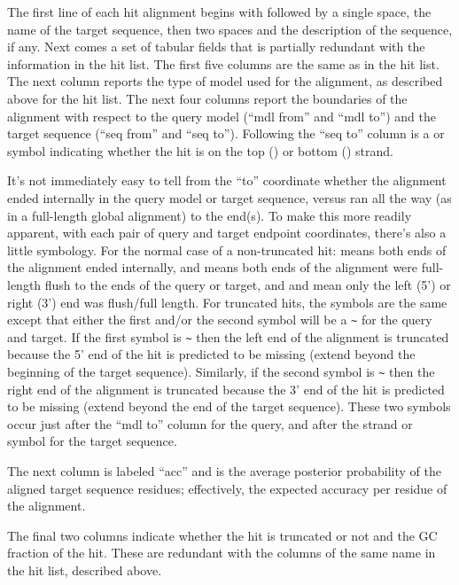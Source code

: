The first line of each hit alignment begins with \otext{>>} followed
by a single space, the name of the target sequence, then two spaces
and the description of the sequence, if any. Next comes a set of
tabular fields that is partially redundant with the information in the
hit list. The first five columns are the same as in the hit list. The
next column reports the type of model used for the alignment, as
described above for the hit list. The next four columns report the
boundaries of the alignment with respect to the query model (``mdl
from'' and ``mdl to'') and the target sequence (``seq from'' and ``seq
to''). Following the ``seq to'' column is a \otext{+} or \otext{-}
symbol indicating whether the hit is on the top (\otext{+}) or bottom
(\otext{-}) strand.

It's not immediately easy to tell from the ``to'' coordinate whether
the alignment ended internally in the query model or target sequence,
versus ran all the way (as in a full-length global alignment) to the
end(s). To make this more readily apparent, with each pair of query
and target endpoint coordinates, there's also a little symbology. For
the normal case of a non-truncated hit:  means both ends of
the alignment ended internally, and \otext{[]} means both ends of the
alignment were full-length flush to the ends of the query or target,
and \otext{[.}  and \otext{.]} mean only the left (5') or right (3') end
was flush/full length. For truncated hits, the symbols are the same
except that either the first and/or the second symbol will be a
\verb+~+ for the query and target. If the first symbol is \verb+~+
then the left end of the alignment is truncated because the 5' end of
the hit is predicted to be missing (extend beyond the beginning of the
target sequence). Similarly, if the second symbol is \verb+~+ then the
right end of the alignment is truncated because the 3' end of the hit
is predicted to be missing (extend beyond the end of the target
sequence). These two symbols occur just after the ``mdl to'' column for
the query, and after the strand \otext{+} or \otext{-} symbol for the
target sequence.

The next column is labeled ``acc'' and is the average posterior
probability of the aligned target sequence residues; effectively, the
expected accuracy per residue of the alignment.

The final two columns indicate whether the hit is truncated or not and
the GC fraction of the hit. These are redundant with the columns of
the same name in the hit list, described above.

